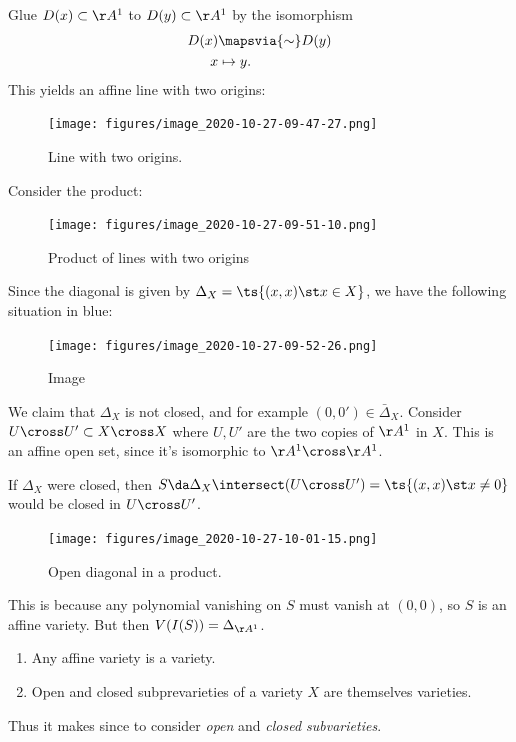 \begin{example}

Glue \(D(x) \subset \AA^1\) to \(D(y) \subset \AA^1\) by the isomorphism
\begin{align*}  
D(x) & \mapsvia{\sim} D(y) \\
x &\mapsto y
.\end{align*} This yields an affine line with two origins:

\begin{figure}
\centering
\texttt{[image: figures/image\_2020-10-27-09-47-27.png]}
\caption{Line with two origins.}
\end{figure}

Consider the product:

\begin{figure}
\centering
\texttt{[image: figures/image\_2020-10-27-09-51-10.png]}
\caption{Product of lines with two origins}
\end{figure}

Since the diagonal is given by \(\Delta_X = \ts{(x, x) \st x\in X}\), we
have the following situation in blue:

\begin{figure}
\centering
\texttt{[image: figures/image\_2020-10-27-09-52-26.png]}
\caption{Image}
\end{figure}

We claim that \(\Delta_X\) is not closed, and for example
\((0, 0') \in \bar{\Delta}_X\). Consider
\(U\cross U' \subset X\cross X\) where \(U, U'\) are the two copies of
\(\AA^1\) in \(X\). This is an affine open set, since it's isomorphic to
\(\AA^1\cross \AA^1\).

If \(\Delta_X\) were closed, then
\(S \da \Delta_X \intersect (U\cross U') = \ts{(x, x) \st x\neq 0}\)
would be closed in \(U\cross U'\).

\begin{figure}
\centering
\texttt{[image: figures/image\_2020-10-27-10-01-15.png]}
\caption{Open diagonal in a product.}
\end{figure}

This is because any polynomial vanishing on \(S\) must vanish at
\((0, 0)\), so \(S\) is an affine variety. But then
\(V(I(S)) = \Delta_{\AA^1}\).

\end{example}

\begin{lemma}[?]

\envlist

\begin{enumerate}
\def\labelenumi{\alph{enumi}.}
\item
  Any affine variety is a variety.
\item
  Open and closed subprevarieties of a variety \(X\) are themselves
  varieties.
\end{enumerate}

Thus it makes since to consider \emph{open} and \emph{closed
subvarieties}.

\end{lemma}

